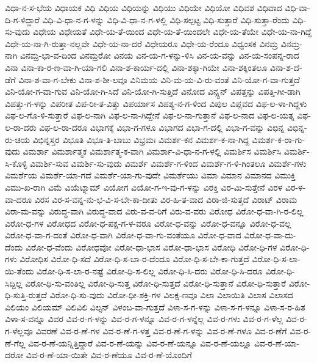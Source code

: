 {ವಿಧಾ-ನ-ಸ-ಭೆಯ
ವಿಧಾಯಕ
ವಿಧಿ
ವಿಧಿಯ
ವಿಧಿಯನ್ನು
ವಿಧಿಯು
ವಿಧಿಯೇ
ವಿಧಿಯೋ
ವಿಧಿವಶ
ವಿಧಿವಾದ
ವಿಧಿ-ವಾ-ದಿ-ಗ-ಳಿದ್ದಾರೆ
ವಿಧಿ-ವಿ-ಧಾ-ನ-ಗ-ಳನ್ನು
ವಿಧಿ-ವಿ-ಧಾ-ನ-ಗ-ಳಲ್ಲಿ
ವಿಧಿ-ಸಲ್ಪಟ್ಟ
ವಿಧಿ-ಸುತ್ತಾರೆ
ವಿಧಿ-ಸುತ್ತಾ-ರೆಂದು
ವಿಧಿ-ಸು-ವುದು
ವಿಧೇಯ
ವಿಧೇಯತೆ
ವಿಧೇ-ಯ-ತೆ-ಯಿಂದ
ವಿಧೇ-ಯ-ತೆ-ಯಿಂದಲೇ
ವಿಧೇ-ಯ-ತೆಯೇ
ವಿಧೇ-ಯ-ನಾ-ಗಿದ್ದೆ
ವಿಧೇ-ಯ-ನಾ-ಗಿ-ರುತ್ತಾ-ನಲ್ಲವೇ
ವಿಧೇ-ಯ-ನಾ-ದರೆ
ವಿಧೇಯರೂ
ವಿಧೇ-ಯ-ರೆಂದೂ
ವಿಧ್ವಂಸಕ
ವಿನಮ್ರ
ವಿನಮ್ರ-ನಾಗಿ
ವಿನಮ್ರ-ಭಾ-ವ-ದಿಂದ
ವಿನಮ್ರರೋ
ವಿನಯ
ವಿನ-ಯ-ಗ-ಳನ್ನು-ಳಿಸಿ
ವಿನ-ಯ-ವನ್ನು
ವಿನ-ಯ-ಸಂಪನ್ನ-ರಾದ
ವಿನಾ
ವಿನಾ-ಕಾ-ರ-ಣ-ವಾ-ಗಿ-ಯಾ-ಗಲಿ
ವಿನಾ-ಶ-ಕಾರ್ಯ-ದಲ್ಲಿ
ವಿನಾ-ಶಕ್ಕಾ-ಗಿಯೇ
ವಿನಾ-ಶಕ್ಕಿಂತಲೂ
ವಿನಾ-ಶ-ದೆ-ಡೆಗೆ
ವಿನಾ-ಶ-ವಾ-ಗ-ಬೇಕು
ವಿನಾ-ಶ-ಶೀ-ಲವೂ
ವಿನಿಮಯ
ವಿನಿ-ಮ-ಯ-ವಿ-ರು-ವಂತೆ
ವಿನಿ-ಯೋ-ಗ-ವಾ-ಗುತ್ತದೆ
ವಿನಿ-ಯೋ-ಗ-ವಾ-ಗುವ
ವಿನಿ-ಯೋ-ಗಿ-ಸಿದೆ
ವಿನಿ-ಯೋ-ಗಿ-ಸುತ್ತಿದೆ
ವಿನೋದ
ವಿನ್ಸ್ಟನ್
ವಿಪತ್ತನ್ನು
ವಿಪತ್ತಿ-ಗೀ-ಡಾಗಿ
ವಿಪತ್ತು-ಗ-ಳನ್ನು
ವಿಪರೀತ
ವಿಪ-ರೀ-ತ-ವಿತ್ತು
ವಿಪರ್ಯಾಸ
ವಿಪಶ್ಯ-ನ-ಗ-ಳಿಂದ
ವಿಪುಲ
ವಿಪ್ಲವದ
ವಿಫ-ಲ-ಳಾ-ಗಿದ್ದಳು
ವಿಫ-ಲ-ಗೊ-ಳಿ-ಸುತ್ತಾರೆ
ವಿಫ-ಲ-ನಾಗಿ
ವಿಫ-ಲ-ನಾ-ಗಿದ್ದೇನೆ
ವಿಫ-ಲ-ನಾ-ಗುತ್ತಾನೆ
ವಿಫ-ಲ-ನಾದ
ವಿಫ-ಲ-ಯತ್ನ
ವಿಫ-ಲ-ರಾ-ದರು
ವಿಫ-ಲ-ರಾ-ದರೂ
ವಿಭಾಗಕ್ಕೆ
ವಿಭಾ-ಗ-ಗಳೂ
ವಿಭಾಗದ
ವಿಭಾ-ಗ-ದಲ್ಲಿ
ವಿಭಾ-ಗ-ವನ್ನು
ವಿಭಿನ್ನ
ವಿಭಿನ್ನ-ರು-ಚಿಯ
ವಿಭಿನ್ನಸ್ತರ
ವಿಭೂತಿ
ವಿಭೂ-ತಿ-ಬಾಬು
ವಿಭ್ರಮಃ
ವಿಮರ್ಶ-ಕನ
ವಿಮರ್ಶ-ಕ-ನಾ-ಗಿದ್ದ
ವಿಮರ್ಶ-ಕ-ರಾ-ಗು-ವುದು
ವಿಮರ್ಶಾ
ವಿಮರ್ಶಾತ್ಮಕ
ವಿಮರ್ಶಾತ್ಮ-ಕ-ವಾಗಿ
ವಿಮರ್ಶಾ-ವಿ-ಧಾ-ನ-ಗ-ಳಲ್ಲಿ
ವಿಮರ್ಶಿಸ
ವಿಮರ್ಶಿಸಿ
ವಿಮರ್ಶಿ-ಸಿ-ಕೊಳ್ಳಿ
ವಿಮರ್ಶಿ-ಸುವ
ವಿಮರ್ಶಿ-ಸು-ವುದು
ವಿಮರ್ಶೆ
ವಿಮರ್ಶೆ-ಗ-ಳಿಂದ
ವಿಮರ್ಶೆ-ಗ-ಳಿ-ಗಿಂತಲೂ
ವಿಮರ್ಶೆ-ಗಳು
ವಿಮರ್ಶೆಯ
ವಿಮರ್ಶೆ-ಯಾ-ಗದೆ
ವಿಮರ್ಶೆ-ಯಾ-ಗು-ವುದೇ
ವಿಮರ್ಶೆಯು
ವಿಮಾ
ವಿಮಾನ
ವಿಮಾನದ
ವಿಮುಕ್ತಿ
ವಿಮು-ಖ-ರಾಗಿ
ವಿಮೆ
ವಿಯೆಟ್ನಾಮ್
ವಿಯೋಗ
ವಿಯೋ-ಗ-ಇ-ವು-ಗ-ಳನ್ನು
ವಿರಕ್ತಿ
ವಿರ-ಮಿ-ಸುತ್ತೇನೆ
ವಿರಳ
ವಿರ-ಳ-ವಾ-ದರೂ
ವಿರಸ
ವಿರ-ಸ-ವನ್ನ-ನು-ಭ-ವಿ-ಸ-ಬೇ-ಕಾ-ದೀತು
ವಿರ-ಹಿ-ತ-ವಾದ
ವಿರಾ-ಜಿ-ಸುತ್ತದೆ
ವಿರಾಟ್
ವಿರಾಮ
ವಿರಾ-ಮ-ವನ್ನು
ವಿರುದ್ಧ-ವಾಗಿ
ವಿರುದ್ಧ-ವಾದ
ವಿರು-ವ-ವ-ರಿಗೆ
ವಿರು-ವ-ವರು
ವಿರೋಧ
ವಿರೋ-ಧ-ವಾ-ಗಿ-ರ-ಲಿಲ್ಲ
ವಿರೋ-ಧ-ಗಳ
ವಿರೋಧದ
ವಿರೋ-ಧ-ಪಕ್ಷ-ಗ-ಳ-ವರೂ
ವಿರೋ-ಧ-ವನ್ನು
ವಿರೋ-ಧ-ವನ್ನೂ
ವಿರೋ-ಧ-ವಲ್ಲ
ವಿರೋ-ಧ-ವಾ-ಗ-ದಂತೆ
ವಿರೋ-ಧ-ವಾಗಿ
ವಿರೋ-ಧ-ವಾ-ಗು-ವಂತೆಯೂ
ವಿರೋ-ಧ-ವಾದ
ವಿರೋ-ಧ-ವಾ-ದು-ದೆಂದು
ವಿರೋ-ಧ-ವೆಂದು
ವಿರೋಧವೋ
ವಿರೋ-ಧಾ-ಭಾಸ
ವಿರೋ-ಧಾ-ಭಾಸ
ವಿರೋಧಿ
ವಿರೋ-ಧಿ-ಗಳ
ವಿರೋ-ಧಿ-ಗಳು
ವಿರೋಧಿಸ
ವಿರೋ-ಧಿ-ಸದೆ
ವಿರೋ-ಧಿ-ಸ-ಬಾ-ರ-ದೆಂದೂ
ವಿರೋ-ಧಿ-ಸ-ಬೇ-ಕಾ-ಗುತ್ತದೆ
ವಿರೋ-ಧಿ-ಸ-ಲಾ-ಯಿ-ತೆಂದು
ವಿರೋ-ಧಿ-ಸ-ಲಾ-ರ-ನಷ್ಟೆ
ವಿರೋ-ಧಿ-ಸ-ಲಿಲ್ಲ
ವಿರೋ-ಧಿ-ಸಿ-ದರು
ವಿರೋ-ಧಿ-ಸಿ-ದರೂ
ವಿರೋ-ಧಿ-ಸಿದ್ದಿಲ್ಲ
ವಿರೋ-ಧಿ-ಸು-ವಂತಿಲ್ಲ
ವಿರೋ-ಧಿ-ಸುತ್ತ
ವಿರೋ-ಧಿ-ಸುತ್ತದೆ
ವಿರೋ-ಧಿ-ಸುತ್ತಾನೆ
ವಿರೋ-ಧಿ-ಸುತ್ತಾರೆ
ವಿರೋ-ಧಿ-ಸುತ್ತಿ-ರುತ್ತದೆ
ವಿರೋ-ಧಿ-ಸು-ವುದು
ವಿರೋ-ಧೀ-ಶಕ್ತಿ-ಗಳ
ವಿಲಕ್ಷ-ಣವೂ
ವಿಲಾ
ವಿಲಾಯಿತಿ
ವಿಲಾಸ
ವಿಲಾಸದ
ವಿಲಿಯಂ
ವಿಲಿಯಮ್
ವಿಲಿವಿಲಿ
ವಿಲ್ಸನ್
ವಿಳಂಬ-ವಾ-ಗುತ್ತದೆ
ವಿಳಾ-ಸ-ಗ-ಳನ್ನು
ವಿಳಾ-ಸ-ಗ-ಳನ್ನೂ
ವಿಳಾ-ಸ-ರ-ಹಿತ
ವಿಳಾ-ಸ-ವನ್ನೂ
ವಿವರ
ವಿವ-ರ-ಗ-ಳನ್ನು
ವಿವ-ರ-ಗ-ಳನ್ನೂ
ವಿವ-ರ-ಗ-ಳನ್ನೆಲ್ಲ
ವಿವ-ರ-ಗಳು
ವಿವ-ರ-ಗ-ಳೆಲ್ಲ
ವಿವ-ರ-ಗ-ಳೆಲ್ಲವೂ
ವಿವರಣೆ
ವಿವ-ರ-ಣೆ-ಗಳ
ವಿವ-ರ-ಣೆ-ಗ-ಳತ್ತ
ವಿವ-ರ-ಣೆ-ಗ-ಳನ್ನು
ವಿವ-ರ-ಣೆ-ಗಳೂ
ವಿವ-ರ-ಣೆಗೆ
ವಿವ-ರ-ಣೆ-ಗೆಲ್ಲ
ವಿವ-ರ-ಣೆ-ಯನ್ನಿತ್ತಿದ್ದಾರೆ
ವಿವ-ರ-ಣೆ-ಯನ್ನು
ವಿವ-ರ-ಣೆ-ಯನ್ನೂ
ವಿವ-ರ-ಣೆ-ಯಲ್ಲೂ
ವಿವ-ರ-ಣೆ-ಯಾ-ದರೋ
ವಿವ-ರ-ಣೆ-ಯಾ-ಯಿತೇ
ವಿವ-ರ-ಣೆಯೂ
ವಿವ-ರ-ಣೆ-ಯೊಂದಿಗೆ
}

